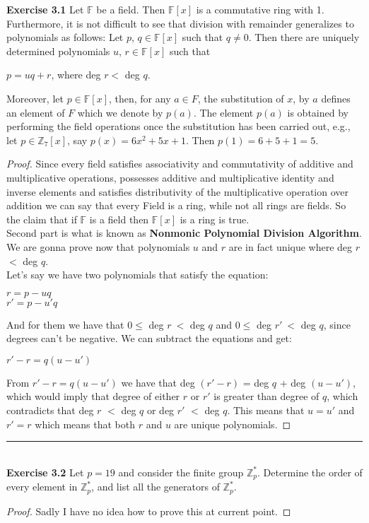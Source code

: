 \documentclass{article}
\newcommand{\subtitle}[1]{%
  \posttitle{%
    \par\end{center}
    \begin{center}\LARGE#1\end{center}
    \vskip0.5em}%
}
\begin{document}
\subtitle{Lecture III}
\noindent \textbf{Exercise 3.1} Let $\mathbb{F}$ be a field. Then $\mathbb{F}[x]$ is a commutative ring with 1. Furthermore, it is not difficult to see that division with remainder generalizes to polynomials as follows: Let $p$, $q \in \mathbb{F}[x]$ such that $q \neq0$. Then there are uniquely determined polynomials $u$, $r \in \mathbb{F}[x]$ such that
\begin{center}
$p = uq + r$, where deg $r<$ deg $q$.	
\end{center}
Moreover, let $p \in \mathbb{F}[x]$, then, for any $a \in F$, the substitution of $x$, by $a$ defines an element of $F$ which we denote by $p(a)$. The element $p(a)$ is obtained by performing the field operations once the substitution has been carried out, e.g., let $p \in \mathbb{Z}_{7}[x]$, say $p(x) = 6x^{2} + 5x + 1$. Then $p(1) = 6 + 5 + 1 = 5$.
\begin{proof}
Since every field satisfies associativity and commutativity of additive and multiplicative operations, possesses additive and multiplicative identity and inverse elements and satisfies distributivity of the multiplicative operation over addition we can say that every Field is a ring, while not all rings are fields. So the claim that if $\mathbb{F}$ is a field then $\mathbb{F}[x]$ is a ring is true.\\
Second part is what is known as \textbf{Nonmonic Polynomial Division Algorithm}. We are gonna prove now that polynomials $u$ and $r$ are in fact unique where deg $r$ $<$ deg $q$.\\
Let's say we have two polynomials that satisfy the equation:
\begin{center}
$r = p - uq$\\
$r' = p - u'q$	
\end{center}
And for them we have that $0 \leq $ deg $r\ <$ deg $q$ and $0 \leq $ deg $r'\ <$ deg $q$, since degrees can't be negative. We can subtract the equations and get:
\begin{center}
$r' - r	= q(u - u')$
\end{center}
From $r' - r	= q(u - u')$ we have that deg $(r' - r)$ = deg $q$ + deg $(u - u')$, which would imply that degree of either $r$ or $r'$ is greater than degree of $q$, which contradicts that deg $r$ $<$ deg $q$ or deg $r'$ $<$ deg $q$. This means that $u=u'$ and $r'=r$ which means that both $r$ and $u$ are unique polynomials.

\end{proof}



\noindent\rule{12cm}{0.4pt}\\
\noindent \textbf{Exercise 3.2} Let $p = 19$ and consider the finite group $\mathbb{Z}^{*}_{p}$. Determine the order of every element in $\mathbb{Z}^{*}_{p}$, and list all the generators of $\mathbb{Z}^{*}_{p}$.
\begin{proof}
Sadly I have no idea how to prove this at current point.
\end{proof}
\end{document}
